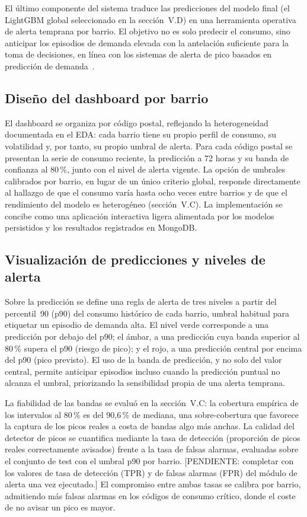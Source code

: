 \documentclass[12pt, a4paper]{article}
\begin{document}
El último componente del sistema traduce las predicciones del modelo final (el LightGBM global seleccionado en la sección~V.D) en una herramienta operativa de alerta temprana por barrio. El objetivo no es solo predecir el consumo, sino anticipar los episodios de demanda elevada con la antelación suficiente para la toma de decisiones, en línea con los sistemas de alerta de pico basados en predicción de demanda~\cite{yasuhiro2020}.

\subsection{Diseño del dashboard por barrio}

El dashboard se organiza por código postal, reflejando la heterogeneidad documentada en el EDA: cada barrio tiene su propio perfil de consumo, su volatilidad y, por tanto, su propio umbral de alerta. Para cada código postal se presentan la serie de consumo reciente, la predicción a 72 horas y su banda de confianza al 80\,\%, junto con el nivel de alerta vigente. La opción de umbrales calibrados por barrio, en lugar de un único criterio global, responde directamente al hallazgo de que el consumo varía hasta ocho veces entre barrios y de que el rendimiento del modelo es heterogéneo (sección~V.C). La implementación se concibe como una aplicación interactiva ligera alimentada por los modelos persistidos y los resultados registrados en MongoDB.

\subsection{Visualización de predicciones y niveles de alerta}

Sobre la predicción se define una regla de alerta de tres niveles a partir del percentil~90 (p90) del consumo histórico de cada barrio, umbral habitual para etiquetar un episodio de demanda alta. El nivel verde corresponde a una predicción por debajo del p90; el ámbar, a una predicción cuya banda superior al 80\,\% supera el p90 (riesgo de pico); y el rojo, a una predicción central por encima del p90 (pico previsto). El uso de la banda de predicción, y no solo del valor central, permite anticipar episodios incluso cuando la predicción puntual no alcanza el umbral, priorizando la sensibilidad propia de una alerta temprana.

La fiabilidad de las bandas se evaluó en la sección~V.C: la cobertura empírica de los intervalos al 80\,\% es del 90,6\,\% de mediana, una sobre-cobertura que favorece la captura de los picos reales a costa de bandas algo más anchas. La calidad del detector de picos se cuantifica mediante la tasa de detección (proporción de picos reales correctamente avisados) frente a la tasa de falsas alarmas, evaluadas sobre el conjunto de test con el umbral p90 por barrio. [PENDIENTE: completar con los valores de tasa de detección (TPR) y de falsas alarmas (FPR) del módulo de alerta una vez ejecutado.] El compromiso entre ambas tasas se calibra por barrio, admitiendo más falsas alarmas en los códigos de consumo crítico, donde el coste de no avisar un pico es mayor.
\end{document}
